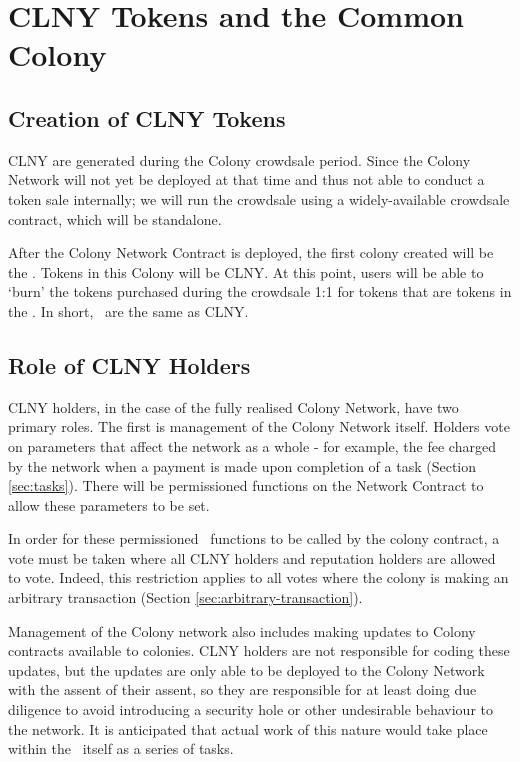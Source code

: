 \section{CLNY Tokens and the Common Colony}\label{sec:clny}

\subsection{Creation of CLNY Tokens}
CLNY are generated during the Colony crowdsale period. Since the Colony Network will not yet be deployed at that time and thus not able to conduct a token sale internally; we will run the crowdsale using a widely-available crowdsale contract, which will be standalone.

After the Colony Network Contract is deployed, the first colony created will be the \rc. Tokens in this Colony will be CLNY. At this point, users will be able to `burn' the tokens purchased during the crowdsale 1:1 for tokens that are tokens in the \rc. In short, \rcts\ are the same as CLNY.

\subsection{Role of CLNY Holders}
CLNY holders, in the case of the fully realised Colony Network, have two primary roles. The first is management of the Colony Network itself. Holders vote on parameters that affect the network as a whole - for example, the fee charged by the network when a payment is made upon completion of a task (Section \ref{sec:tasks}). There will be permissioned functions on the Network Contract to allow these parameters to be set. 

In order for these permissioned \rc\ functions to be called by the colony contract, a vote must be taken where all CLNY holders and reputation holders are allowed to vote. Indeed, this restriction applies to all votes where the colony is making an arbitrary transaction (Section \ref{sec:arbitrary-transaction}).

Management of the Colony network also includes making updates to Colony contracts available to colonies. CLNY holders are not responsible for coding these updates, but the updates are only able to be deployed to the Colony Network with the assent of their assent, so they are responsible for at least doing due diligence to avoid introducing a security hole or other undesirable behaviour to the network. It is anticipated that actual work of this nature would take place within the \rc\ itself as a series of tasks.

